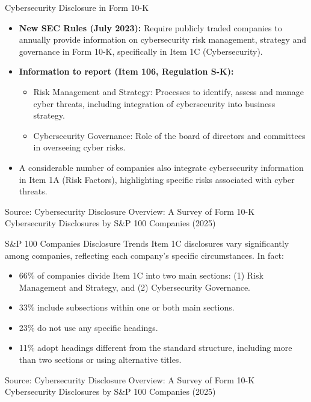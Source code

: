 \documentclass{beamer}
\begin{document}
\begin{frame}{Cybersecurity Disclosure in Form 10-K}
\begin{itemize}
\item \textbf{New SEC Rules (July 2023):} Require publicly traded companies to annually provide information on cybersecurity risk management, strategy and governance in Form 10-K, specifically in Item 1C (Cybersecurity).
\item \textbf{Information to report (Item 106, Regulation S-K):}
\begin{itemize}
\item Risk Management and Strategy: Processes to identify, assess and manage cyber threats, including integration of cybersecurity into business strategy.
\item Cybersecurity Governance: Role of the board of directors and committees in overseeing cyber risks.
\end{itemize}
\item A considerable number of companies also integrate cybersecurity information in Item 1A (Risk Factors), highlighting specific risks associated with cyber threats.
\end{itemize}

\vspace{0.5cm}
\footnotesize{Source: Cybersecurity Disclosure Overview: A Survey of Form 10-K Cybersecurity Disclosures by S\&P 100 Companies (2025)}
\end{frame}

\begin{frame}{S\&P 100 Companies Disclosure Trends}
Item 1C disclosures vary significantly among companies, reflecting each company's specific circumstances. In fact:
\begin{itemize}
\item 66\% of companies divide Item 1C into two main sections: (1) Risk Management and Strategy, and (2) Cybersecurity Governance.
\item 33\% include subsections within one or both main sections.
\item 23\% do not use any specific headings.
\item 11\% adopt headings different from the standard structure, including more than two sections or using alternative titles.
\end{itemize}

\vspace{0.5cm}
\footnotesize{Source: Cybersecurity Disclosure Overview: A Survey of Form 10-K Cybersecurity Disclosures by S\&P 100 Companies (2025)}
\end{frame}
\end{document}
